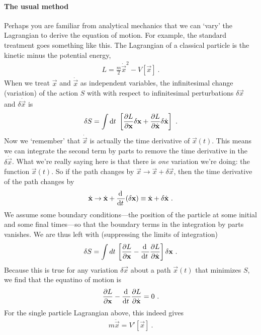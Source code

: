 \paragraph{The usual method}
Perhaps you are familiar from analytical mechanics that we can `vary' the Lagrangian to derive the equation of motion. For example, the standard treatment goes something like this. The Lagrangian of a classical particle is the kinetic minus the potential energy,
\begin{align}
    L = \frac{m}{2} \dot{\vec{x}}^2 - V[\vec{x}] \ .
\end{align}
When we treat $\vec{x}$ and $\dot{\vec{x}}$ as independent variables, the infinitesimal change (variation) of the action $S$ with with respect to infinitesimal perturbations $\delta\vec{x}$ and $\delta\dot{\vec{x}}$ is
\begin{align}
    \delta S =
    \int \operatorname{d}\mkern-3mu^{}\mkern-1mu{t}\, \,
    \left[
    \frac{\partial L}{\partial \mathbf{x}} \delta\mathbf{x}
    +
    \frac{\partial L}{\partial \dot{\mathbf{x}}}\delta\dot{\mathbf{x}}
    \right] \ .
\end{align}
Now we `remember' that $\dot{\vec{x}}$ is actually the time derivative of $\vec{x}(t)$. This means we can integrate the second term by parts to remove the time derivative in the $\delta\dot{\vec{x}}$. What we're really saying here is that there is \emph{one} variation we're doing: the function $\vec{x}(t)$. So if the path changes by $\vec{x}\to\vec{x}+\delta\vec{x}$, then the time derivative of the path changes by
\begin{align}
    \dot{\mathbf{x}} 
    \to \dot{\mathbf{x}} 
    + \frac{\operatorname{d}\mkern-3mu^{}\mkern-1mu{}\,}{\operatorname{d}\mkern-3mu^{}\mkern-1mu{t}\,}(\delta\mathbf{x}) 
    \equiv \dot{\mathbf{x}} + \delta\dot{\mathbf{x}} \ . 
\end{align}
We assume some boundary conditions---the position of the particle at some initial and some final times---so that the boundary terms in the integration by parts vanishes. We are thus left with (suppressing the limits of integration)
\begin{align}
    \delta S = \int dt\, 
    \left[
    \frac{\partial L}{\partial \mathbf{x}}
    - 
    \frac{\operatorname{d}\mkern-3mu^{}\mkern-1mu{}\,}{\operatorname{d}\mkern-3mu^{}\mkern-1mu{t}\,}
    \frac{\partial L}{\partial \dot{\mathbf{x}}} 
    \right]\delta\mathbf{x} \ .
\end{align}
Because this is true for any variation $\delta\vec{x}$ about a path $\vec{x}(t)$ that minimizes $S$, we find that the equatino of motion is 
\begin{align}
    \frac{\partial L}{\partial \mathbf{x}}
    - 
    \frac{\operatorname{d}\mkern-3mu^{}\mkern-1mu{}\,}{\operatorname{d}\mkern-3mu^{}\mkern-1mu{t}\,}
    \frac{\partial L}{\partial \dot{\mathbf{x}}}  = 0 \ .
\end{align}
For the single particle Lagrangian above, this indeed gives
\begin{align}
    m\ddot{\vec{x}} = V'[\vec{x}] \ .
\end{align}

